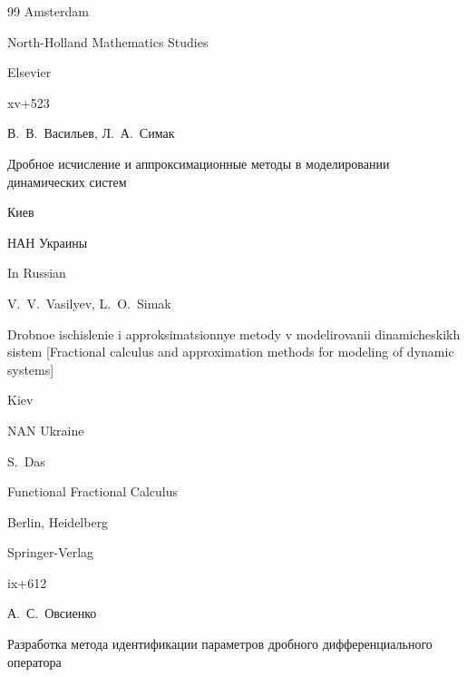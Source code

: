 \begin{thebibliography}{99}
\publaddr Amsterdam

\serial North-Holland Mathematics Studies 


\publ Elsevier


\totalpages xv+523





\by В.~В.~Васильев, Л.~А.~Симак

\book Дробное исчисление и аппроксимационные методы в моделировании динамических систем

\publaddr Киев

\publ НАН Украины



\misctransl

\lang In Russian

\by V.~V.~Vasilyev, L.~O.~Simak  


\book Drobnoe ischislenie i approksimatsionnye metody v modelirovanii dinamicheskikh sistem \rm [Fractional calculus and approximation methods for modeling of dynamic systems]

\publaddr Kiev

\publ NAN Ukraine









\by S.~Das

\book Functional Fractional Calculus

\publaddr Berlin, Heidelberg

\publ Springer-Verlag

\totalpages ix+612














\by А.~С.~Овсиенко

\paper Разработка метода идентификации параметров дробного дифференциального оператора


\end{thebibliography}

